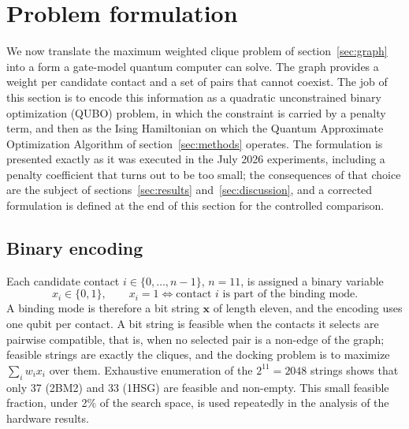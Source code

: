 \documentclass{iopjournal}
\begin{document}
\section{Problem formulation}
\label{sec:formulation}

We now translate the maximum weighted clique problem of section~\ref{sec:graph} into a form a gate-model quantum computer can solve. The graph provides a weight per candidate contact and a set of pairs that cannot coexist. The job of this section is to encode this information as a quadratic unconstrained binary optimization (QUBO) problem, in which the constraint is carried by a penalty term, and then as the Ising Hamiltonian on which the Quantum Approximate Optimization Algorithm of section~\ref{sec:methods} operates. The formulation is presented exactly as it was executed in the July 2026 experiments, including a penalty coefficient that turns out to be too small; the consequences of that choice are the subject of sections~\ref{sec:results} and~\ref{sec:discussion}, and a corrected formulation is defined at the end of this section for the controlled comparison.

\subsection{Binary encoding}
\label{sec:encoding}
Each candidate contact $i \in \{0,\dots,n-1\}$, $n = 11$, is assigned a binary variable
\begin{equation}
\label{eq:x}
x_i \in \{0,1\}, \qquad x_i = 1 \iff \text{contact } i \text{ is part of the binding mode}.
\end{equation}
A binding mode is therefore a bit string $\mathbf{x}$ of length eleven, and the encoding uses one qubit per contact. A bit string is feasible when the contacts it selects are pairwise compatible, that is, when no selected pair is a non-edge of the graph; feasible strings are exactly the cliques, and the docking problem is to maximize $\sum_i w_i x_i$ over them. Exhaustive enumeration of the $2^{11} = 2048$ strings shows that only 37 (2BM2) and 33 (1HSG) are feasible and non-empty. This small feasible fraction, under 2\% of the search space, is used repeatedly in the analysis of the hardware results.
\end{document}
